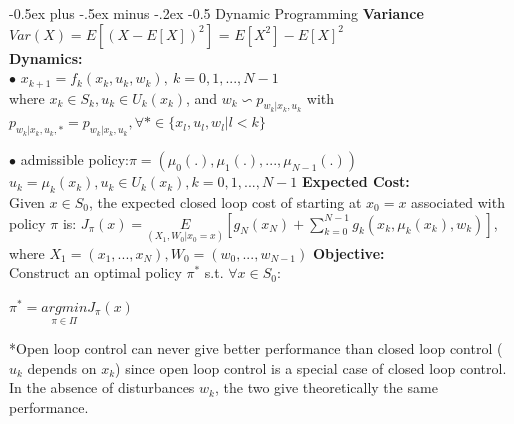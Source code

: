 \documentclass[10pt,landscape]{article}
\makeatletter
\renewcommand{\section}{\@startsection{section}{1}{0mm}%
                                {-0.5ex plus -.5ex minus -.2ex}%
                                {-0.5\baselineskip}%
                                {\normalfont\small\bfseries}}
\makeatother
\begin{document}
\raggedright

\scriptsize

\begin{multicols*}{4}

\setlength{\columnseprule}{0.25pt}
\setlength{\premulticols}{0.25pt}
\setlength{\postmulticols}{0.25pt}
\setlength{\multicolsep}{0.25pt}
\setlength{\columnsep}{0.25pt}

\section{Dynamic Programming}
\textbf{Variance} $Var(X) = E[(X-E[X])^2]$ = $E[X^2]-E[X]^2$\\
\textbf{Dynamics:} \\
$ \bullet$ $x_{k+1}=f_k(x_k, u_k, w_k),\ k = 0,1,...,N-1$\\
where $x_k \in S_k, u_k \in U_k(x_k)$, and $w_k \backsim p_{w_k|x_k,u_k}$ with $p_{w_k|x_k,u_k,*}=p_{w_k|x_k,u_k}, \forall * \in \{ x_l, u_l, w_l | l<k\}$

$\bullet$ admissible policy:$\pi = (\mu_0(.),\mu_1(.),...,\mu_{N-1}(.))$\\
$u_k = \mu_k(x_k), u_k \in U_k(x_k), k=0,1,...,N-1$
\textbf{Expected Cost:}\\
Given $x\in S_0$, the expected closed loop cost of starting at $x_0 = x$ associated with policy $\pi$ is:
$J_{\pi}(x) = \underset{(X_1, W_0|x_0=x)}{E} [g_N(x_N) + \sum_{k=0}^{N-1} g_k(x_k, \mu_k(x_k), w_k)]$,\\
where $X_1 = (x_1,...,x_N), W_0 = (w_0, ...,w_{N-1})$
\textbf{Objective:}\\
Construct an optimal policy $\pi ^ *$ s.t. $\forall x \in S_0$:\\
\begin{center}
	$\pi ^ * = \underset{\pi \in \Pi}{argmin} J_{\pi}(x)$
\end{center}

*Open loop control can never give better performance than closed loop control ($u_k$ depends on $x_k$)
since open loop control is a special case of closed loop control.
In the absence of disturbances $w_k$, the two give theoretically the same
performance.
\\


\end{multicols*}
\end{document}
